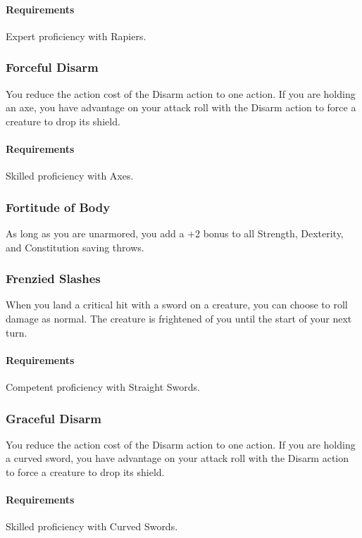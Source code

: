     \paragraph{Requirements} Expert proficiency with Rapiers.
\subsubsection{Forceful Disarm} \label{feat::forcefuldisarm}
    You reduce the action cost of the Disarm action to one action.
    If you are holding an axe, you have advantage on your attack roll with the Disarm action to force a creature to drop its shield.
    \paragraph{Requirements} Skilled proficiency with Axes.
\subsubsection{Fortitude of Body} \label{feat::fortitudeofbody}
    As long as you are unarmored, you add a +2 bonus to all Strength, Dexterity, and Constitution saving throws.
\subsubsection{Frenzied Slashes} \label{feat::frenziedslashes}
    When you land a critical hit with a sword on a creature, you can choose to roll damage as normal.
    The creature is frightened of you until the start of your next turn.
    \paragraph{Requirements} Competent proficiency with Straight Swords.
\subsubsection{Graceful Disarm} \label{feat::gracefuldisarm}
    You reduce the action cost of the Disarm action to one action.
    If you are holding a curved sword, you have advantage on your attack roll with the Disarm action to force a creature to drop its shield.
    \paragraph{Requirements} Skilled proficiency with Curved Swords.
